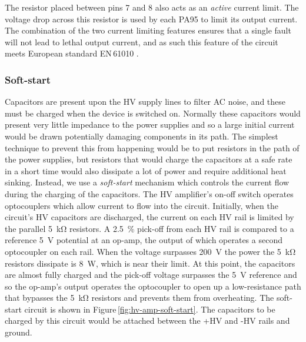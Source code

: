 The resistor placed between pins 7 and 8 also acts as an \emph{active} current limit. The voltage drop across this resistor is used by each PA95 to limit its output current. The combination of the two current limiting features ensures that a single fault will not lead to lethal output current, and as such this feature of the circuit meets European standard EN\,61010 \cite{EN2010}.

\subsubsection{Soft-start}
Capacitors are present upon the \gls{HV} supply lines to filter \gls{AC} noise, and these must be charged when the device is switched on. Normally these capacitors would present very little impedance to the power supplies and so a large initial current would be drawn potentially damaging components in its path. The simplest technique to prevent this from happening would be to put resistors in the path of the power supplies, but resistors that would charge the capacitors at a safe rate in a short time would also dissipate a lot of power and require additional heat sinking. Instead, we use a \emph{soft-start} mechanism which controls the current flow during the charging of the capacitors. The \gls{HV} amplifier's on-off switch operates optocouplers which allow current to flow into the circuit. Initially, when the circuit's \gls{HV} capacitors are discharged, the current on each \gls{HV} rail is limited by the parallel \SI{5}{\kilo\ohm} resistors. A \SI{2.5}{\percent} pick-off from each \gls{HV} rail is compared to a reference \SI{5}{\volt} potential at an op-amp, the output of which operates a second optocoupler on each rail. When the voltage surpasses \SI{200}{\volt} the power the \SI{5}{\kilo\ohm} resistors dissipate is \SI{8}{\watt}, which is near their limit. At this point, the capacitors are almost fully charged and the pick-off voltage surpasses the \SI{5}{\volt} reference and so the op-amp's output operates the optocoupler to open up a low-resistance path that bypasses the \SI{5}{\kilo\ohm} resistors and prevents them from overheating. The soft-start circuit is shown in Figure\,\ref{fig:hv-amp-soft-start}. The capacitors to be charged by this circuit would be attached between the +HV and -HV rails and ground.

